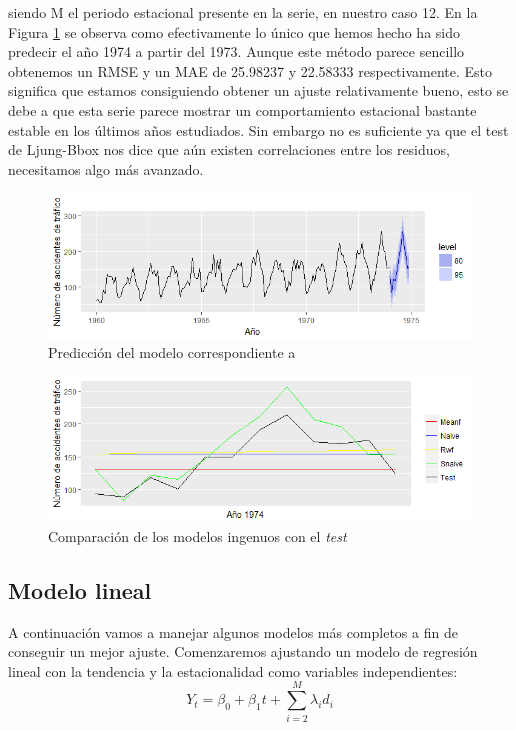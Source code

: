 \noindent siendo M el periodo estacional presente en la serie, en nuestro caso 12. En la Figura \ref{snaives} se observa como efectivamente lo único que hemos hecho ha sido predecir el año 1974 a partir del 1973. Aunque este método parece sencillo obtenemos un RMSE y un MAE de 25.98237 y 22.58333 respectivamente. Esto significa que estamos consiguiendo obtener un ajuste relativamente bueno, esto se debe a que esta serie parece mostrar un comportamiento estacional bastante estable en los últimos años estudiados. Sin embargo no es suficiente ya que el test de Ljung-Bbox nos dice que aún existen correlaciones entre los residuos, necesitamos algo más avanzado.
\begin{figure}
    \centering
    \centerline{\includegraphics[scale = 0.7]{Images/Modelizacion/310.png}}
    \caption{Predicción del modelo correspondiente a }
    \label{snaives}
\end{figure}

\begin{figure}
    \centering
    \centerline{\includegraphics[scale = 0.7]{Images/Modelizacion/311.png}}
    \caption{Comparación de los modelos ingenuos con el \textit{test}}
    \label{comp}
\end{figure}

\subsection{Modelo lineal}
A continuación vamos a manejar algunos modelos más completos a fin de conseguir un mejor ajuste. Comenzaremos ajustando un modelo de regresión lineal con la tendencia y la estacionalidad como variables independientes:
\begin{equation}
    Y_{t} = \beta_0 + \beta_1 t + \sum_{i = 2}^{M} \lambda_i d_i
\end{equation}

